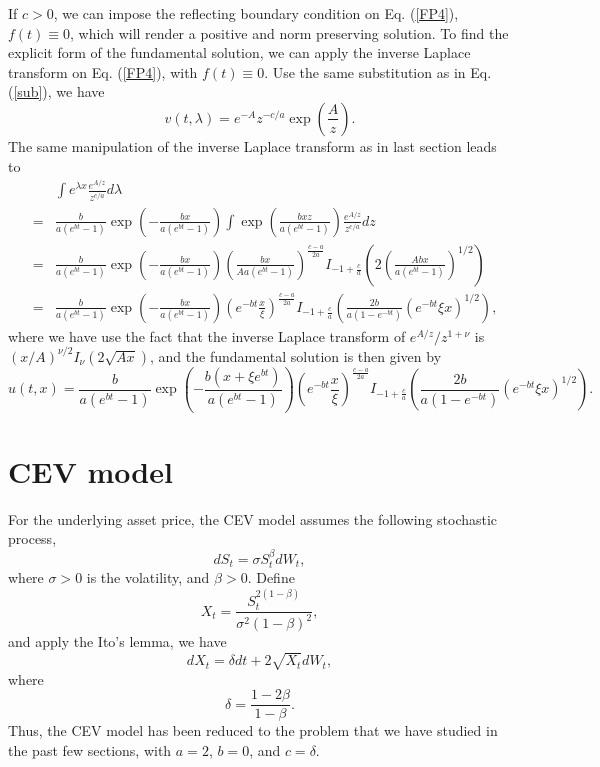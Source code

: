 \documentclass[12pt]{article}
\begin{document}
    If $c>0$, we can impose the reflecting boundary condition on Eq. (\ref{FP4}), $f(t)\equiv 0$, which will render a positive
    and norm preserving solution. To find the
    explicit form of the fundamental solution, we can apply the inverse Laplace transform on Eq. (\ref{FP4}), with $f(t)\equiv 0$.
    Use the same substitution as in Eq. (\ref{sub}),
    we have
    \begin{equation}
      v(t,\lambda) = e^{-A}z^{-c/a}\exp\left(\frac{A}{z}\right).
    \end{equation}
    The same manipulation of the inverse Laplace transform as in last section leads to
    \begin{eqnarray}
      &&\int e^{\lambda x} \frac{e^{A/z}}{z^{c/a}}d\lambda\nonumber\\
      &=& \frac{b}{a(e^{bt}-1)}\exp\left(-\frac{bx}{a(e^{bt}-1)}\right)\int \exp\left(\frac{bxz}{a(e^{bt}-1)}\right)\frac{e^{A/z}}{z^{c/a}}dz \nonumber\\
      &=& \frac{b}{a(e^{bt}-1)}\exp\left(-\frac{bx}{a(e^{bt}-1)}\right)\left(\frac{bx}{Aa(e^{bt}-1)}\right)^{\frac{c-a}{2a}}I_{-1+\frac{c}{a}}\left(2\left(\frac{Abx}{a(e^{bt}-1)}\right)^{1/2}\right) \nonumber\\
      &=& \frac{b}{a(e^{bt}-1)}\exp\left(-\frac{bx}{a(e^{bt}-1)}\right)\left(e^{-bt}\frac{x}{\xi}\right)^{\frac{c-a}{2a}}I_{-1+\frac{c}{a}}\left(\frac{2b}{a(1-e^{-bt})}\left(e^{-bt}\xi x\right)^{1/2}\right),
    \end{eqnarray}
    where we have use the fact that the inverse Laplace transform of $e^{A/z}/z^{1+\nu}$ is $(x/A)^{\nu/2}I_{\nu}(2\sqrt{Ax})$,
    and the fundamental solution is then given by
    \begin{equation}
      u(t,x)=\frac{b}{a(e^{bt}-1)}\exp\left(-\frac{b(x+\xi e^{bt})}{a(e^{bt}-1)}\right)\left(e^{-bt}\frac{x}{\xi}\right)^{\frac{c-a}{2a}}I_{-1+\frac{c}{a}}\left(\frac{2b}{a(1-e^{-bt})}\left(e^{-bt}\xi x\right)^{1/2}\right).
      \label{reflecting}
    \end{equation}



\section{CEV model}

  For the underlying asset price, the CEV model assumes the following stochastic process,
  \begin{equation}
    dS_t=\sigma S_t^{\beta}dW_t,
  \end{equation}
  where $\sigma>0$ is the volatility, and $\beta>0$. Define \cite{Brecher}
  \begin{equation}
    X_t=\frac{S_t^{2(1-\beta)}}{\sigma^2(1-\beta)^2},
  \end{equation}
  and apply the Ito's lemma, we have
  \begin{equation}
    dX_t = \delta dt + 2\sqrt{X_t}dW_t,
  \end{equation}
  where
  \begin{equation}
    \delta = \frac{1-2\beta}{1-\beta}.
  \end{equation}
  Thus, the CEV model has been reduced to the problem that we have studied in the past few sections, with
  $a=2$, $b=0$, and $c=\delta$.
\end{document}
